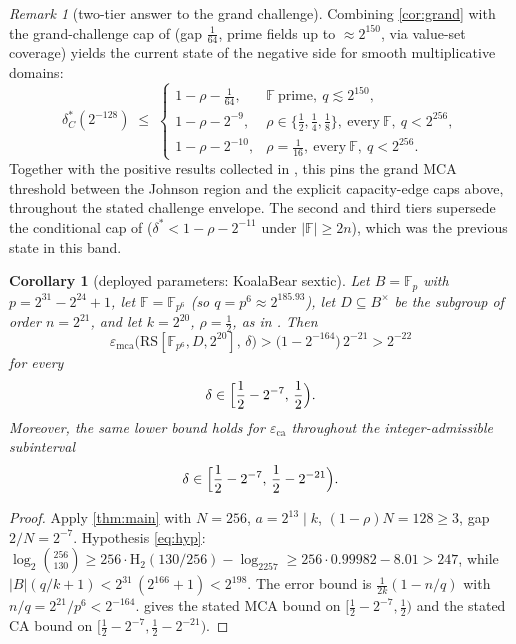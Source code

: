 \documentclass[11pt]{article}
\newtheorem{corollary}[theorem]{Corollary}
\theoremstyle{definition}
\theoremstyle{remark}
\newtheorem{remark}[theorem]{Remark}
\newcommand{\F}{\mathbb{F}}
\newcommand{\B}{B}
\newcommand{\RS}{\mathrm{RS}}
\newcommand{\eca}{\varepsilon_{\mathrm{ca}}}
\newcommand{\emca}{\varepsilon_{\mathrm{mca}}}
\newcommand{\Hb}{\mathrm{H}_2}
\begin{document}
\begin{remark}[two-tier answer to the grand challenge]\label{rem:twotier}
Combining \cref{cor:grand} with the grand-challenge cap of \cite[Prop.\ ``Grand-challenge cap'']{Cho26b} (gap $\frac1{64}$, prime fields up to $\approx2^{150}$, via value-set coverage) yields the current state of the negative side for smooth multiplicative domains:
\[
\delta^*_C(2^{-128})\;\le\;
\begin{cases}
1-\rho-\frac1{64}, & \F\ \text{prime},\ q\lesssim2^{150},\\[2pt]
1-\rho-2^{-9}, & \rho\in\{\frac12,\frac14,\frac18\},\ \text{every}\ \F,\ q<2^{256},\\[2pt]
1-\rho-2^{-10}, & \rho=\frac1{16},\ \text{every}\ \F,\ q<2^{256}.
\end{cases}
\]
Together with the positive results collected in \cite[Table~1]{ABF26}, this pins the grand MCA threshold between the Johnson region and the explicit capacity-edge caps above, throughout the stated challenge envelope. The second and third tiers supersede the conditional cap of \cite[Thm.\ ``Universal cap'']{Cho26b} ($\delta^*<1-\rho-2^{-11}$ under $|\F|\ge2n$), which was the previous state in this band.
\end{remark}

\begin{corollary}[deployed parameters: KoalaBear sextic]\label{cor:deployed}
Let $\B=\F_p$ with $p=2^{31}-2^{24}+1$, let $\F=\F_{p^6}$ (so $q=p^6\approx2^{185.93}$), let $D\subseteq\B^\times$ be the subgroup of order $n=2^{21}$, and let $k=2^{20}$, $\rho=\frac12$, as in \cite[\S6.3]{ABF26}. Then
\[
\emca\bigl(\RS[\F_{p^6},D,2^{20}],\,\delta\bigr)
>
\bigl(1-2^{-164}\bigr)\,2^{-21}
>
2^{-22}
\]
for every
\[
        \delta\in\Bigl[\frac12-2^{-7},\,\frac12\Bigr).
\]
Moreover, the same lower bound holds for $\eca$ throughout the integer-admissible subinterval
\[
        \delta\in
        \Bigl[\frac12-2^{-7},\,\frac12-2^{-21}\Bigr).
\]
\end{corollary}

\begin{proof}
Apply \cref{thm:main} with $N=256$, $a=2^{13}\mid k$, $(1-\rho)N=128\ge3$, gap $2/N=2^{-7}$. Hypothesis \eqref{eq:hyp}: $\log_2\binom{256}{130}\ge256\cdot\Hb(130/256)-\log_2257\ge256\cdot0.99982-8.01>247$, while $|\B|(q/k+1)<2^{31}\,(2^{166}+1)<2^{198}$. The error bound is $\frac1{2k}(1-n/q)$ with $n/q=2^{21}/p^6<2^{-164}$.  gives the stated MCA bound on $[\frac12-2^{-7},\frac12)$ and the stated CA bound on $[\frac12-2^{-7},\frac12-2^{-21})$.
\end{proof}
\end{document}
